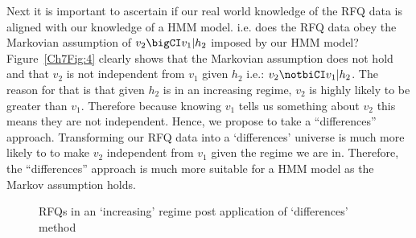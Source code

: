 Next it is important to ascertain if our real world knowledge of the RFQ data is aligned with our knowledge of a HMM model. i.e. does the RFQ data obey the Markovian assumption of $v_2 \bigCI v_1 | h_2$ imposed by our HMM model?\\

Figure~\ref{Ch7Fig:4} clearly shows that the Markovian assumption does not hold and that $v_2$ is not independent from $v_1$ given $h_2$ i.e.: $v_2 \notbiCI v_1 | h_2$. The reason for that is that given $h_2$ is in an increasing regime, $v_2$ is highly likely to be greater than $v_1$. Therefore because knowing $v_1$ tells us something about $v_2$ this means they are not independent. Hence, we propose to take a ``differences'' approach. Transforming our RFQ data into a `differences' universe is much more likely to to make $v_2$ independent from $v_1$ given the regime we are in. Therefore, the ``differences'' approach is much more suitable for a HMM model as the Markov assumption holds.

\begin{figure}[!ht]\centering
    \caption{RFQs in an `increasing' regime post application of `differences' method}\label{Ch7Fig:5}
\end{figure}



